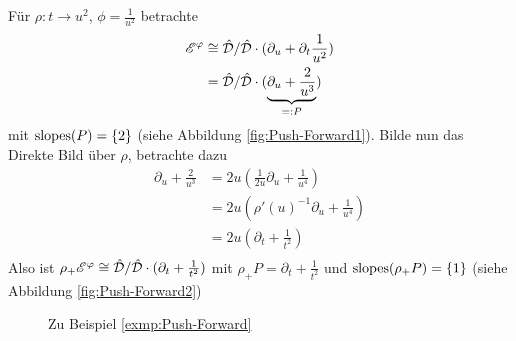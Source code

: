 \begin{exmp}\label{exmp:Push-Forward}
Für $\rho:t\rightarrow u^2$, $\phi=\frac{1}{u^2}$ betrachte
\begin{align*}
\mathscr{E}^\varphi &\cong\hat{\mathcal{D}}/\hat{\mathcal{D}}\cdot(\partial_u+\partial_t\frac{1}{u^2})\\
&= \hat{\mathcal{D}}/\hat{\mathcal{D}}\cdot
(\underset{=:P}{\underbrace{\partial_u+\frac{2}{u^3}}})
\end{align*}
mit $ \operatorname{slopes}(P)=\{2\} $ (siehe Abbildung \ref{fig:Push-Forward1}).
Bilde nun das Direkte Bild über $\rho$, betrachte dazu
\begin{align*}
\partial_u+\frac{2}{u^3} &= 2u(\frac{1}{2u}\partial_u+\frac{1}{u^4}) \\
&= 2u(\rho'(u)^{-1}\partial_u+\frac{1}{u^4}) \\
&= 2u(\partial_t+\frac{1}{t^2})\\
\end{align*}
Also ist
$\rho_+\mathscr{E}^\varphi\cong \hat{\mathcal{D}}/\hat{\mathcal{D}}\cdot(\partial_t+\frac{1}{t^2})$
mit $\rho_+P=\partial_t+\frac{1}{t^2}$ und $ \operatorname{slopes}(\rho_+P)=\{1\} $ (siehe
Abbildung \ref{fig:Push-Forward2})
\begin{figure}[h]
\label{fig:Push-Forward}
\caption{Zu Beispiel \ref{exmp:Push-Forward}}
\begin{center}
\quad
{}
\end{center}
\end{figure}
\end{exmp}


